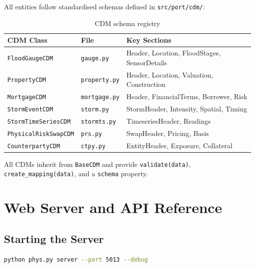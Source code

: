 \documentclass[11pt,a4paper]{article}
\begin{document}
All entities follow standardised schemas defined in \texttt{src/port/cdm/}:

\begin{table}[H]
    \centering
    \caption{CDM schema registry}
    \label{tab:cdm}
    \begin{tabular}{@{}lll@{}}
        \toprule
        \textbf{CDM Class} & \textbf{File} & \textbf{Key Sections} \\
        \midrule
        \texttt{FloodGaugeCDM}        & \texttt{gauge.py}    & Header, Location, FloodStages, SensorDetails \\
        \texttt{PropertyCDM}          & \texttt{property.py} & Header, Location, Valuation, Construction \\
        \texttt{MortgageCDM}          & \texttt{mortgage.py} & Header, FinancialTerms, Borrower, Risk \\
        \texttt{StormEventCDM}        & \texttt{storm.py}    & StormHeader, Intensity, Spatial, Timing \\
        \texttt{StormTimeSeriesCDM}   & \texttt{stormts.py}  & TimeseriesHeader, Readings \\
        \texttt{PhysicalRiskSwapCDM}  & \texttt{prs.py}      & SwapHeader, Pricing, Basis \\
        \texttt{CounterpartyCDM}      & \texttt{ctpy.py}     & EntityHeader, Exposure, Collateral \\
        \bottomrule
    \end{tabular}
\end{table}

All CDMs inherit from \texttt{BaseCDM} and provide \texttt{validate(data)},
\texttt{create\_mapping(data)}, and a \texttt{schema} property.

\section{Web Server and API Reference}

\subsection{Starting the Server}

\begin{lstlisting}[language=bash]
python phys.py server --port 5013 --debug
\end{lstlisting}
\end{document}
